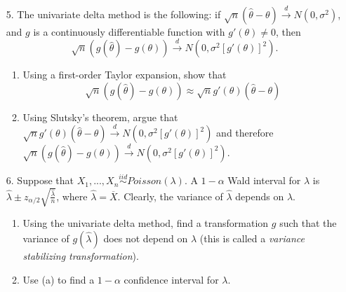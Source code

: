 \documentclass[11pt]{article}
\begin{document}
\begin{enumerate}
\item[5.] The univariate delta method is the following: if $\sqrt{n}(\widehat{\theta} - \theta) \overset{d}{\to} N(0, \sigma^2)$, and $g$ is a continuously differentiable function with $g'(\theta) \neq 0$, then
$$\sqrt{n}(g(\widehat{\theta}) - g(\theta)) \overset{d}{\to} N(0, \sigma^2 [g'(\theta)]^2).$$

\begin{enumerate}
\item Using a first-order Taylor expansion, show that
$$\sqrt{n}(g(\widehat{\theta}) - g(\theta)) \approx \sqrt{n}g'(\theta)(\widehat{\theta} - \theta)$$

\item Using Slutsky's theorem, argue that $\sqrt{n} g'(\theta)(\widehat{\theta} - \theta) \overset{d}{\to} N(0, \sigma^2 [g'(\theta)]^2)$ and therefore $\sqrt{n}(g(\widehat{\theta}) - g(\theta)) \overset{d}{\to} N(0, \sigma^2 [g'(\theta)]^2)$.
\end{enumerate}

\item[6.] Suppose that $X_1,...,X_n \overset{iid}{\sim} Poisson(\lambda)$. A $1 - \alpha$ Wald interval for $\lambda$ is $\widehat{\lambda} \pm z_{\alpha/2} \sqrt{\frac{\widehat{\lambda}}{n}}$, where $\widehat{\lambda} = \overline{X}$. Clearly, the variance of $\widehat{\lambda}$ depends on $\lambda$. 

\begin{enumerate}
\item Using the univariate delta method, find a transformation $g$ such that the variance of $g(\widehat{\lambda})$ does not depend on $\lambda$ (this is called a \textit{variance stabilizing transformation}).

\item Use (a) to find a $1 - \alpha$ confidence interval for $\lambda$.
\end{enumerate}

\end{enumerate}
\end{document}
